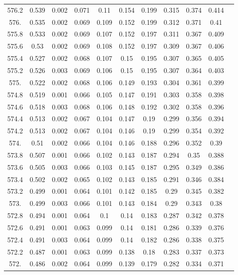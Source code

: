 \documentclass[12pt]{ctexart}
\numberwithin{equation}{section}
\begin{document}
\begin{longtable}{ccccccccccc}
576.2	&	0.539	&	0.002	&	0.071	&	0.11	&	0.154	&	0.199	&	0.315	&	0.374	&	0.414	\\
576.	&	0.535	&	0.002	&	0.069	&	0.109	&	0.152	&	0.199	&	0.312	&	0.371	&	0.41	\\
575.8	&	0.533	&	0.002	&	0.069	&	0.107	&	0.152	&	0.197	&	0.311	&	0.367	&	0.409	\\
575.6	&	0.53	&	0.002	&	0.069	&	0.108	&	0.152	&	0.197	&	0.309	&	0.367	&	0.406	\\
575.4	&	0.527	&	0.002	&	0.068	&	0.107	&	0.15	&	0.195	&	0.307	&	0.365	&	0.405	\\
575.2	&	0.526	&	0.003	&	0.069	&	0.106	&	0.15	&	0.195	&	0.307	&	0.364	&	0.403	\\
575.	&	0.522	&	0.002	&	0.068	&	0.106	&	0.149	&	0.193	&	0.304	&	0.361	&	0.399	\\
574.8	&	0.519	&	0.001	&	0.066	&	0.105	&	0.147	&	0.191	&	0.303	&	0.358	&	0.398	\\
574.6	&	0.518	&	0.003	&	0.068	&	0.106	&	0.148	&	0.192	&	0.302	&	0.358	&	0.396	\\
574.4	&	0.513	&	0.002	&	0.067	&	0.104	&	0.147	&	0.19	&	0.299	&	0.356	&	0.394	\\
574.2	&	0.513	&	0.002	&	0.067	&	0.104	&	0.146	&	0.19	&	0.299	&	0.354	&	0.392	\\
574.	&	0.51	&	0.002	&	0.066	&	0.104	&	0.146	&	0.188	&	0.296	&	0.352	&	0.39	\\
573.8	&	0.507	&	0.001	&	0.066	&	0.102	&	0.143	&	0.187	&	0.294	&	0.35	&	0.388	\\
573.6	&	0.505	&	0.003	&	0.066	&	0.103	&	0.145	&	0.187	&	0.295	&	0.349	&	0.386	\\
573.4	&	0.502	&	0.002	&	0.065	&	0.102	&	0.143	&	0.185	&	0.291	&	0.346	&	0.384	\\
573.2	&	0.499	&	0.001	&	0.064	&	0.101	&	0.142	&	0.185	&	0.29	&	0.345	&	0.382	\\
573.	&	0.499	&	0.003	&	0.066	&	0.101	&	0.143	&	0.184	&	0.29	&	0.343	&	0.38	\\
572.8	&	0.494	&	0.001	&	0.064	&	0.1	&	0.14	&	0.183	&	0.287	&	0.342	&	0.378	\\
572.6	&	0.491	&	0.001	&	0.063	&	0.099	&	0.14	&	0.181	&	0.286	&	0.339	&	0.376	\\
572.4	&	0.491	&	0.003	&	0.064	&	0.099	&	0.14	&	0.182	&	0.286	&	0.338	&	0.375	\\
572.2	&	0.487	&	0.001	&	0.063	&	0.099	&	0.138	&	0.18	&	0.283	&	0.337	&	0.373	\\
572.	&	0.486	&	0.002	&	0.064	&	0.099	&	0.139	&	0.179	&	0.282	&	0.334	&	0.371	\\

\end{longtable}
\end{document}
